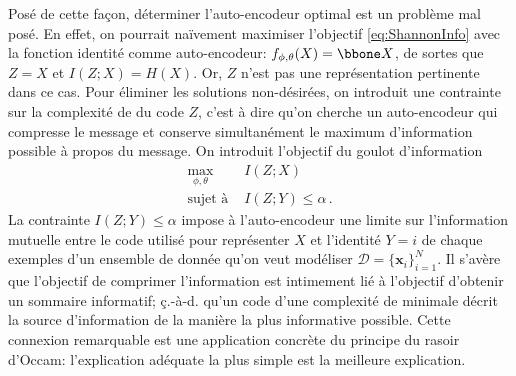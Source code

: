 

Posé de cette façon, déterminer l'auto-encodeur optimal est un problème mal posé. En effet, on pourrait naïvement maximiser l'objectif \eqref{eq:ShannonInfo} avec 
la fonction identité comme auto-encodeur: $f_{\phi,\theta}(X) = \bbone X$, de sortes que $Z = X$ et $I(Z; X) = H(X)$. 
Or, $Z$ n'est pas une représentation pertinente dans ce cas. 
Pour éliminer les solutions non-désirées, on introduit une contrainte sur la complexité de \citet{Kolmogorov1965} du code $Z$, c'est à dire qu'on cherche 
un auto-encodeur qui compresse le message et conserve simultanément 
le maximum d'information possible à propos du message. On introduit l'objectif du goulot d'information \citep{Tishby1999}
\begin{equation}\label{eq:IB}
\begin{aligned}
        \underset{\phi,\theta}{\mathrm{max}}&\,\,I(Z ; X) \\[1ex]
        \text{sujet à}&\,\, I(Z; Y) \leq \alpha\, .
\end{aligned}
\end{equation} 
La contrainte $I(Z; Y) \leq \alpha$ impose à l'auto-encodeur %
une limite sur l'information mutuelle entre le code 
utilisé pour représenter $X$ et l'identité $Y=i$ de chaque exemples d'un ensemble de donnée qu'on veut modéliser $\mathcal{D} = \{\mathbf{x}_i \}_{i=1}^{N}$.
Il s'avère que l'objectif de comprimer l'information est intimement lié à l'objectif d'obtenir un sommaire informatif; ç.-à-d. qu'un 
code d'une complexité de \citet{Kolmogorov1965} minimale décrit la source d'information de la manière la plus informative possible. Cette connexion 
remarquable est une application concrète du principe du rasoir d'Occam: l'explication adéquate la plus simple est la meilleure explication.

